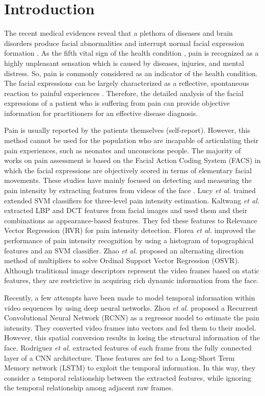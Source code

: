 \documentclass[a4paper,conference]{IEEEtran}
\begin{document}
\IEEEpeerreviewmaketitle


\section{Introduction}
\label{Intro}
The recent medical evidences reveal that a plethora of diseases and brain disorders produce facial abnormalities and interrupt normal facial expression formation \cite{c2}. As the fifth vital sign of the health condition \cite{c3}, pain is recognized as a highly unpleasant sensation which is caused by diseases, injuries, and mental distress. So, pain is commonly considered as an indicator of the health condition. The facial expressions can be largely characterized as a reflective, spontaneous reaction to painful experiences \cite{c4}. Therefore, the detailed analysis of the facial expressions of a patient who is suffering from pain can provide objective information for practitioners for an effective disease diagnosis. 

Pain is usually reported by the patients themselves (self-report). However, this method cannot be used for the population who are incapable of articulating their pain experiences, such as neonates and unconscious people. The majority of works on pain assessment is based on the Facial Action Coding System (FACS) \cite{c5} in which the facial expressions are objectively scored in terms of elementary facial movements. These studies have mainly focused on detecting and measuring the pain intensity by extracting features from videos of the face \cite{c6,c7}. Lucy \emph{et al.} \cite{c7} trained extended SVM classifiers for three-level pain intensity estimation. Kaltwang \emph{et al.} \cite{c8} extracted LBP and DCT features from facial images and used them and their combinations as appearance-based features. They fed these features to Relevance Vector Regression (RVR) for pain intensity detection. Florea \emph{et al.} \cite{c9} improved the performance of pain intensity recognition by using a histogram of topographical features and an SVM classifier. Zhao \emph{et al.} \cite{c10} proposed an alternating direction method of multipliers to solve Ordinal Support Vector Regression (OSVR). Although traditional image descriptors represent the video frames based on static features, they are restrictive in acquiring rich dynamic information from the face. 

Recently, a few attempts have been made to model temporal information within video sequences by using deep neural networks. Zhou \emph{et al.} \cite{c11} proposed a Recurrent Convolutional Neural Network (RCNN) as a regressor model to estimate the pain intensity. They converted video frames into vectors and fed them to their model. However, this spatial conversion results in losing the structural information of the face. Rodriguez \emph{et al.} \cite{c12} extracted features of each frame from the fully connected layer of a CNN architecture. These features are fed to a Long-Short Term Memory network (LSTM) to exploit the temporal information. In this way, they consider a temporal relationship between the extracted features, while ignoring the temporal relationship among adjacent raw frames.
\end{document}
